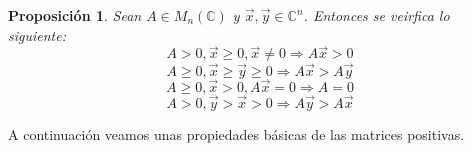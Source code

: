 \documentclass[size=a4, parskip=half, titlepage=false, toc=flat, toc=bib, 12pt, twoside]{scrartcl}
\theoremstyle{theorem-style}
\newtheorem{nprop}{Proposición}[section]
\theoremstyle{definition-style}
\theoremstyle{remark-style}
\theoremstyle{example-style}
\theoremstyle{definition-style}
\theoremstyle{remark-style}
\begin{document}
\begin{nprop}
Sean $A \in M_n(\mathbb{C})$ y $\vec{x},\vec{y} \in \mathbb{C}^n$. Entonces se veirfica lo siguiente:
\begin{equation}\label{eq1} A > 0, \vec{x} \geq 0, \vec{x} \neq 0 \Rightarrow A \vec{x} > 0 \end{equation}
\begin{equation} A \geq 0, \vec{x} \geq \vec{y} \geq 0 \Rightarrow A \vec{x} > A\vec{y} \end{equation}
\begin{equation} A \geq 0, \vec{x} > 0, A \vec{x} = 0 \Rightarrow A = 0 \end{equation}
\begin{equation} \label{eq4} A > 0, \vec{y} > \vec{x} > 0 \Rightarrow A\vec{y} > A\vec{x} \end{equation}
\end{nprop}

A continuación veamos unas propiedades básicas de las matrices positivas.
\end{document}
